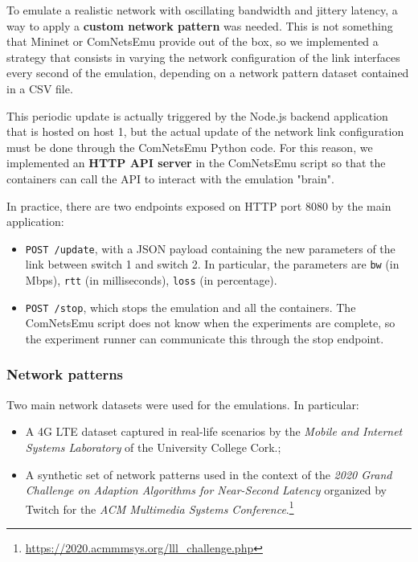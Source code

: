 To emulate a realistic network with oscillating bandwidth and jittery latency, a way to apply a \textbf{custom network pattern} was needed. This is not something that Mininet or ComNetsEmu provide out of the box, so we implemented a strategy that consists in varying the network configuration of the link interfaces every second of the emulation, depending on a network pattern dataset contained in a CSV file.

This periodic update is actually triggered by the Node.js backend application that is hosted on host 1, but the actual update of the network link configuration must be done through the ComNetsEmu Python code. For this reason, we implemented an \textbf{HTTP API server} in the ComNetsEmu script so that the containers can call the API to interact with the emulation "brain".

In practice, there are two endpoints exposed on HTTP port 8080 by the main application:

\begin{itemize}
    \item \texttt{POST /update}, with a JSON payload containing the new parameters of the link between switch 1 and switch 2. In particular, the parameters are \texttt{bw} (in Mbps), \texttt{rtt} (in milliseconds), \texttt{loss} (in percentage).
    \item \texttt{POST /stop}, which stops the emulation and all the containers. The ComNetsEmu script does not know when the experiments are complete, so the experiment runner can communicate this through the stop endpoint.
\end{itemize}

\subsubsection{Network patterns}
\label{sec:eval/testbed/network/patterns}

Two main network datasets were used for the emulations. In particular:

\begin{itemize}
    \item A 4G LTE dataset captured in real-life scenarios by the \textit{Mobile and Internet Systems Laboratory} of the University College Cork.\cite{dataset1};
    \item A synthetic set of network patterns used in the context of the \textit{2020 Grand Challenge on Adaption Algorithms for Near-Second Latency} organized by Twitch for the \textit{ACM Multimedia Systems Conference}.\footnote{\url{https://2020.acmmmsys.org/lll_challenge.php}}
\end{itemize}

